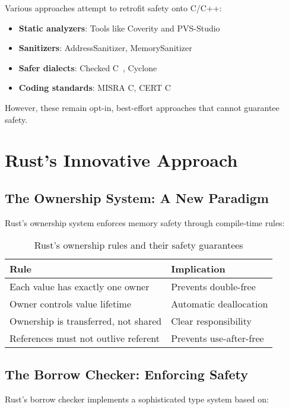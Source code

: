 \documentclass[11pt]{article}
\begin{document}
Various approaches attempt to retrofit safety onto C/C++:
\begin{itemize}
    \item \textbf{Static analyzers}: Tools like Coverity and PVS-Studio
    \item \textbf{Sanitizers}: AddressSanitizer, MemorySanitizer
    \item \textbf{Safer dialects}: Checked C~\cite{checkedc2018}, Cyclone
    \item \textbf{Coding standards}: MISRA C, CERT C
\end{itemize}

However, these remain opt-in, best-effort approaches that cannot guarantee safety.

\section{Rust's Innovative Approach}

\subsection{The Ownership System: A New Paradigm}

Rust's ownership system enforces memory safety through compile-time rules:

\begin{table}[h]
\centering
\begin{tabular}{@{}ll@{}}
\toprule
\textbf{Rule} & \textbf{Implication} \\
\midrule
Each value has exactly one owner & Prevents double-free \\
Owner controls value lifetime & Automatic deallocation \\
Ownership is transferred, not shared & Clear responsibility \\
References must not outlive referent & Prevents use-after-free \\
\bottomrule
\end{tabular}
\caption{Rust's ownership rules and their safety guarantees}
\label{tab:ownership}
\end{table}

\subsection{The Borrow Checker: Enforcing Safety}

Rust's borrow checker implements a sophisticated type system based on:
\end{document}
